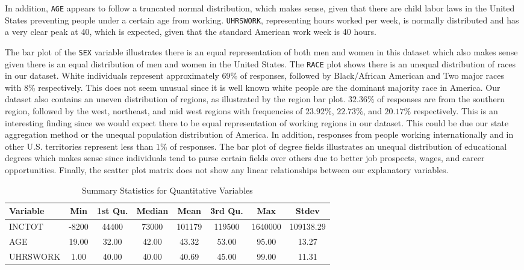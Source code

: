 \documentclass{article}
\begin{document}
In addition, \texttt{AGE} appears to follow a truncated normal distribution, which makes sense, given that there are child labor laws in the United States preventing people under a certain age from working. \texttt{UHRSWORK}, representing hours worked per week, is normally distributed and has a very clear peak at 40, which is expected, given that the standard American work week is 40 hours. 

The bar plot of the \texttt{SEX} variable illustrates there is an equal representation of both men and women in this dataset which also makes sense given there is an equal distribution of men and women in the United States. The \texttt{RACE} plot shows there is an unequal distribution of races in our dataset. White individuals represent approximately 69\% of responses, followed by Black/African American and Two major races with 8\% respectively. This does not seem unusual since it is well known white people are the dominant majority race in America. Our dataset also contains an uneven distribution of regions, as illustrated by the region bar plot. $32.36\%$ of responses are from the southern region, followed by the west, northeast, and mid west regions with frequencies of $23.92\%$, $22.73\%$, and $20.17\%$ respectively. This is an interesting finding since we would expect there to be equal representation of working regions in our dataset. This could be due our state aggregation method or the unequal population distribution of America. In addition, responses from people working internationally and in other U.S. territories represent less than $1\%$ of responses. The bar plot of degree fields illustrates an unequal distribution of educational degrees which makes sense since individuals tend to purse certain fields over others due to better job prospects, wages, and career opportunities. Finally, the scatter plot matrix does not show any linear relationships between our explanatory variables. 

\begin{table}[ht]
    \centering
    \caption{Summary Statistics for Quantitative Variables}
    \begin{tabular}{@{}lccccccc@{}}
    \toprule
    Variable & Min & 1st Qu. & Median & Mean & 3rd Qu. & Max & Stdev \\ 
    \midrule
    INCTOT   & -8200 & 44400 & 73000 & 101179 & 119500 & 1640000 & 109138.29 \\
    AGE      & 19.00 & 32.00 & 42.00 & 43.32 & 53.00 & 95.00 & 13.27 \\
    UHRSWORK & 1.00 & 40.00 & 40.00 & 40.69 & 45.00 & 99.00 & 11.31 \\
    \bottomrule
    \end{tabular}
\end{table}
\end{document}
